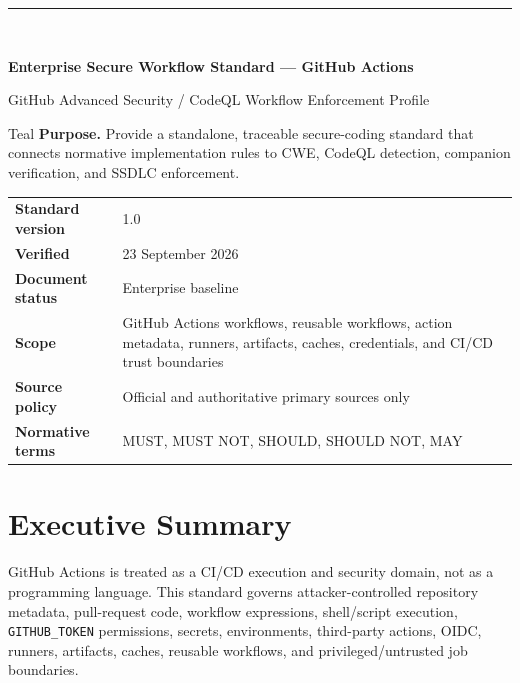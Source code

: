 \documentclass[10pt,letterpaper]{article}
\newcommand{\code}[1]{\texttt{\small #1}}
\begin{document}
\fancyhead[L]{\textcolor{Muted}{Enterprise Secure Workflow Standard --- GitHub Actions}}
\fancyhead[R]{\textcolor{Muted}{v1.0 --- 23 September 2026}}
\hypersetup{pageanchor=false}
\begin{titlepage}
\thispagestyle{empty}
\vspace*{0.85in}
{\color{Teal}\rule{1.2in}{3pt}}\\[0.32in]
{\Huge\bfseries\color{Navy}Enterprise Secure Workflow Standard --- GitHub Actions\par}
\vspace{0.18in}
{\Large\color{Teal}GitHub Advanced Security / CodeQL Workflow Enforcement Profile\par}
\vspace{0.55in}
\begin{callout}{Teal}
\textbf{Purpose.} Provide a standalone, traceable secure-coding standard that connects normative implementation rules to CWE, CodeQL detection, companion verification, and SSDLC enforcement.
\end{callout}
\vfill
\begin{tabularx}{\textwidth}{@{}P{1.45in}Y@{}}
\textbf{Standard version} & 1.0 \\
\textbf{Verified} & 23 September 2026 \\
\textbf{Document status} & Enterprise baseline \\
\textbf{Scope} & GitHub Actions workflows, reusable workflows, action metadata, runners, artifacts, caches, credentials, and CI/CD trust boundaries \\
\textbf{Source policy} & Official and authoritative primary sources only \\
\textbf{Normative terms} & MUST, MUST NOT, SHOULD, SHOULD NOT, MAY \\
\end{tabularx}
\vspace{0.55in}
\end{titlepage}
\hypersetup{pageanchor=true}
\tableofcontents
\clearpage
{}

\section{Executive Summary}
GitHub Actions is treated as a CI/CD execution and security domain, not as a programming language. This standard governs attacker-controlled repository metadata, pull-request code, workflow expressions, shell/script execution, \code{GITHUB\_TOKEN} permissions, secrets, environments, third-party actions, OIDC, runners, artifacts, caches, reusable workflows, and privileged/untrusted job boundaries.
\end{document}
